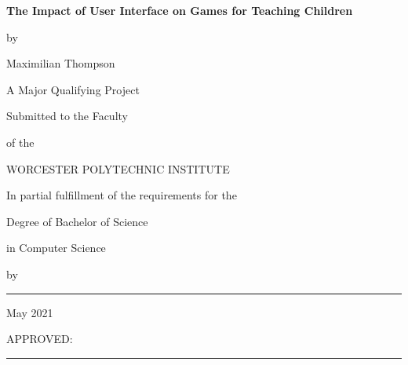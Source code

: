 \documentclass[12pt]{report}
\begin{document}
	
\sloppy

%


%
\newcommand{\brk}{\vspace*{0.18in}}

\thispagestyle{empty}

\begin{center}

\brk


   {\large 
	\textbf{
	 The Impact of User Interface on Games for Teaching Children
	}
   }


\brk
by

\brk
Maximilian Thompson

\brk\brk
A Major Qualifying Project

\brk
Submitted to the Faculty

\brk
of the 

\brk
WORCESTER POLYTECHNIC INSTITUTE
	
\brk
In partial fulfillment of the requirements for the

\brk
Degree of Bachelor of Science

\brk
in Computer Science

\brk


\brk
by

\brk\brk
\rule{3in}{1.2pt}

\brk
May 2021

\end{center}

	
\vfill
APPROVED:

\vspace{0.5in}
\rule{3in}{0.8pt}
\end{document}
